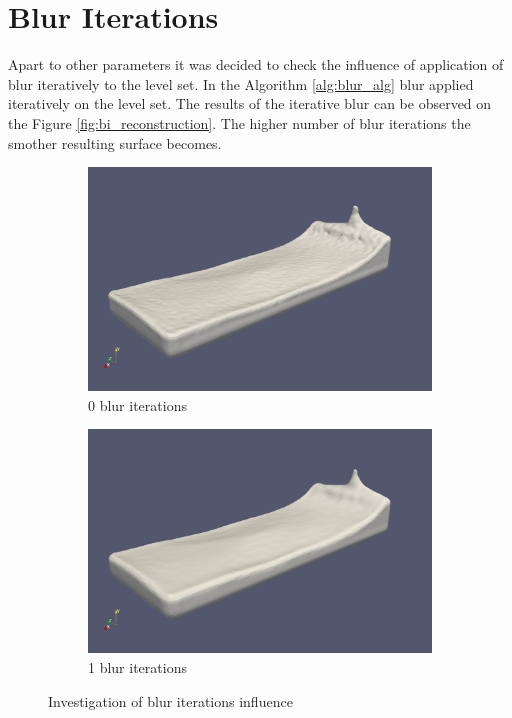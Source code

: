 \section{Blur Iterations}
Apart to other parameters it was decided to check the influence of application of blur iteratively to the level set. In the Algorithm \ref{alg:blur_alg} blur applied iteratively on the level set. The results of the iterative blur can be observed on the Figure \ref{fig:bi_reconstruction}. The higher number of blur iterations the smother resulting surface becomes. 
\begin{figure}[H]
        \begin{subfigure}[b]{\textwidth}
               \includegraphics[width=\textwidth]{figures/ReconstructionIterations0.png}
				\caption{0 blur iterations}
               \label{fig:bi_original}
        \end{subfigure}
        \begin{subfigure}[b]{\textwidth}
               \includegraphics[width=\textwidth]{figures/ReconstructionIterations1.png}
				\caption{1 blur iterations}

				\label{fig:bi_1iteration}
        \end{subfigure}
       \caption{Investigation of blur iterations influence}
       \label{fig:bi_reconstruction1}

\end{figure}

